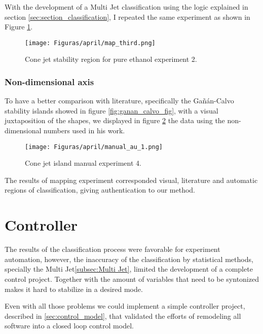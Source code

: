     With the development of a Multi Jet classification using the logic explained in section \ref{sec:section_classification}, I repeated the same experiment as shown in Figure \ref{fig:stability_6}.


        \begin{figure}[H]
            \center
            \texttt{[image: Figuras/april/map\_third.png]}
            \caption{Cone jet stability region for pure ethanol experiment 2.}
            \label{fig:stability_6}
        \end{figure}


    \subsubsection{Non-dimensional axis}

    To have a better comparison with literature, specifically the Gañán-Calvo\cite{gananCalvo} stability islands showed in figure \ref{fig:ganan_calvo_fig}, with a visual juxtaposition of the shapes, we displayed in figure \ref{fig:stability_8} the data using the non-dimensional numbers used in his work\cite{gananCalvo}.

        \begin{figure}[H]
            \center
            \texttt{[image: Figuras/april/manual\_au\_1.png]}
            \caption{Cone jet island manual experiment 4.}
            \label{fig:stability_8}
        \end{figure}

    The results of mapping experiment corresponded visual, literature and automatic regions of classification, giving authentication to our method.


\section{Controller}
\label{sec:controller_results}

    The results of the classification process were favorable for experiment automation, however, the inaccuracy of the classification by statistical methods, specially the Multi Jet\ref{subsec:Multi Jet}, limited the development of a complete control project.
    Together with the amount of variables that need to be syntonized makes it hard to stabilize in a desired mode.

    Even with all those problems we could implement a simple controller project, described in \ref{sec:control_model}, that validated the efforts of remodeling all software into a closed loop control model.
    
